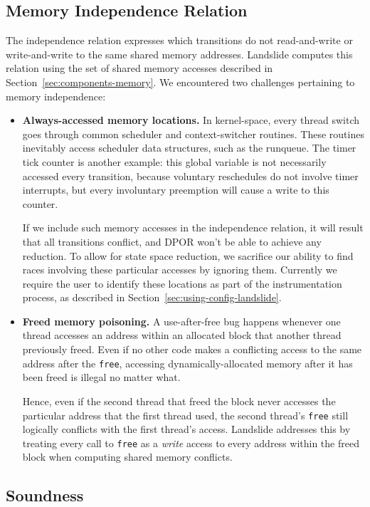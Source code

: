 \subsection{Memory Independence Relation}
\label{sec:por-independence}
The independence relation expresses which transitions do not read-and-write or write-and-write to the same shared memory addresses. Landslide computes this relation using the set of shared memory accesses described in Section~\ref{sec:components-memory}. We encountered two challenges pertaining to memory independence:

\begin{itemize}
	\item {\bf Always-accessed memory locations.}
		In kernel-space, every thread switch goes through common scheduler and context-switcher routines. These routines inevitably access scheduler data structures, such as the runqueue. The timer tick counter is another example: this global variable is not necessarily accessed every transition, because voluntary reschedules do not involve timer interrupts, but every involuntary preemption will cause a write to this counter.

		If we include such memory accesses in the independence relation, it will result that all transitions conflict, and DPOR won't be able to achieve any reduction. To allow for state space reduction, we sacrifice our ability to find races involving these particular accesses by ignoring them. Currently we require the user to identify these locations as part of the instrumentation process, as described in Section~\ref{sec:using-config-landslide}.
	\item {\bf Freed memory poisoning.}
		A use-after-free bug happens whenever one thread accesses an address within an allocated block that another thread previously freed. Even if no other code makes a conflicting access to the same address after the \texttt{free}, accessing dynamically-allocated memory after it has been freed is illegal no matter what.

		Hence, even if the second thread that freed the block never accesses the particular address that the first thread used, the second thread's \texttt{free} still logically conflicts with the first thread's access. Landslide addresses this by treating every call to \texttt{free} as a {\em write} access to every address within the freed block when computing shared memory conflicts.
\end{itemize}

\subsection{Soundness}

